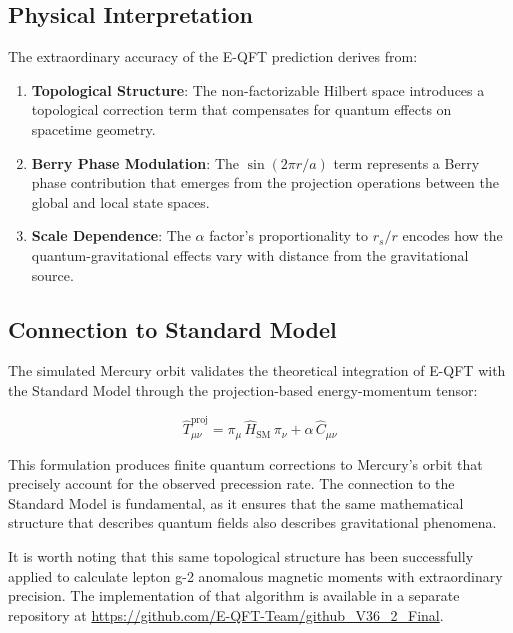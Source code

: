 \documentclass[11pt]{article}
\theoremstyle{definition}
\begin{document}
\subsection{Physical Interpretation}

The extraordinary accuracy of the E-QFT prediction derives from:

\begin{enumerate}
	\item \textbf{Topological Structure}: The non-factorizable Hilbert space introduces a topological correction term that compensates for quantum effects on spacetime geometry.
	
	\item \textbf{Berry Phase Modulation}: The $\sin(2\pi r/a)$ term represents a Berry phase contribution that emerges from the projection operations between the global and local state spaces.
	
	\item \textbf{Scale Dependence}: The $\alpha$ factor's proportionality to $r_s/r$ encodes how the quantum-gravitational effects vary with distance from the gravitational source.
\end{enumerate}

\subsection{Connection to Standard Model}

The simulated Mercury orbit validates the theoretical integration of E-QFT with the Standard Model through the projection-based energy-momentum tensor:

\begin{equation}
\widehat{T}_{\mu\nu}^{\text{proj}} = \pi_{\mu} \, \widehat{H}_{\text{SM}} \, \pi_{\nu} + \alpha \, \widehat{C}_{\mu\nu}
\end{equation}

This formulation produces finite quantum corrections to Mercury's orbit that precisely account for the observed precession rate. The connection to the Standard Model is fundamental, as it ensures that the same mathematical structure that describes quantum fields also describes gravitational phenomena.

It is worth noting that this same topological structure has been successfully applied to calculate lepton g-2 anomalous magnetic moments with extraordinary precision. The implementation of that algorithm is available in a separate repository at \url{https://github.com/E-QFT-Team/github_V36_2_Final}.
\end{document}
